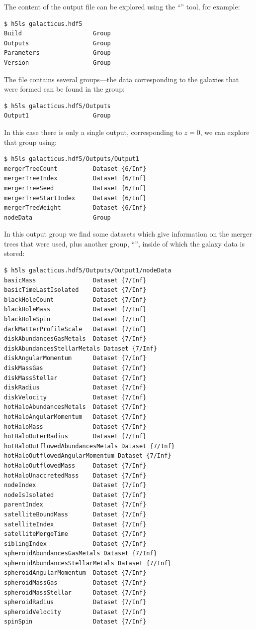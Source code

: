 The content of the output file can be explored using the ``'' tool, for example:
\begin{verbatim}
$ h5ls galacticus.hdf5
Build                    Group
Outputs                  Group
Parameters               Group
Version                  Group
\end{verbatim}
The file contains several groups---the data corresponding to the galaxies that were formed can be found in the  group:
\begin{verbatim}
$ h5ls galacticus.hdf5/Outputs
Output1                  Group
\end{verbatim}
In this case there is only a single output, corresponding to $z=0$, we can explore that group using:
\begin{verbatim}
$ h5ls galacticus.hdf5/Outputs/Output1
mergerTreeCount          Dataset {6/Inf}
mergerTreeIndex          Dataset {6/Inf}
mergerTreeSeed           Dataset {6/Inf}
mergerTreeStartIndex     Dataset {6/Inf}
mergerTreeWeight         Dataset {6/Inf}
nodeData                 Group
\end{verbatim}
In this output group we find some datasets which give information on the merger trees that were used, plus another group, ``'', inside of which the galaxy data is stored:
\begin{verbatim}
$ h5ls galacticus.hdf5/Outputs/Output1/nodeData
basicMass                Dataset {7/Inf}
basicTimeLastIsolated    Dataset {7/Inf}
blackHoleCount           Dataset {7/Inf}
blackHoleMass            Dataset {7/Inf}
blackHoleSpin            Dataset {7/Inf}
darkMatterProfileScale   Dataset {7/Inf}
diskAbundancesGasMetals  Dataset {7/Inf}
diskAbundancesStellarMetals Dataset {7/Inf}
diskAngularMomentum      Dataset {7/Inf}
diskMassGas              Dataset {7/Inf}
diskMassStellar          Dataset {7/Inf}
diskRadius               Dataset {7/Inf}
diskVelocity             Dataset {7/Inf}
hotHaloAbundancesMetals  Dataset {7/Inf}
hotHaloAngularMomentum   Dataset {7/Inf}
hotHaloMass              Dataset {7/Inf}
hotHaloOuterRadius       Dataset {7/Inf}
hotHaloOutflowedAbundancesMetals Dataset {7/Inf}
hotHaloOutflowedAngularMomentum Dataset {7/Inf}
hotHaloOutflowedMass     Dataset {7/Inf}
hotHaloUnaccretedMass    Dataset {7/Inf}
nodeIndex                Dataset {7/Inf}
nodeIsIsolated           Dataset {7/Inf}
parentIndex              Dataset {7/Inf}
satelliteBoundMass       Dataset {7/Inf}
satelliteIndex           Dataset {7/Inf}
satelliteMergeTime       Dataset {7/Inf}
siblingIndex             Dataset {7/Inf}
spheroidAbundancesGasMetals Dataset {7/Inf}
spheroidAbundancesStellarMetals Dataset {7/Inf}
spheroidAngularMomentum  Dataset {7/Inf}
spheroidMassGas          Dataset {7/Inf}
spheroidMassStellar      Dataset {7/Inf}
spheroidRadius           Dataset {7/Inf}
spheroidVelocity         Dataset {7/Inf}
spinSpin                 Dataset {7/Inf}
\end{verbatim}
